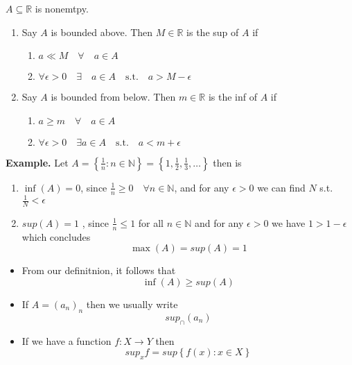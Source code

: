 \documentclass{article}
\theoremstyle{remark}
\begin{document}
\begin{lemma}
  $A \subseteq  \mathbb{R} $  is nonemtpy. 
  \begin{enumerate}
    \item Say $A$ is bounded above. Then $M \in  \mathbb{R} $ is the sup of $A$ if 
      \begin{enumerate}
        \item $a \ll  M \quad  \forall \quad  a \in  A  $ 
        \item $\forall \epsilon > 0 \quad  \exists \quad   a \in  A \quad  \text{s.t.} \quad a > M  - \epsilon    $
      \end{enumerate}
    \item Say $A$ is bounded from below.  Then $m \in  \mathbb{R} $ is the inf of $A$ if 
      \begin{enumerate}
        \item $a \ge m \quad  \forall \quad  a \in  A  $
        \item $ \forall \epsilon  > 0 \quad  \exists a \in  A \quad  \text{s.t.} \quad  a < m +\epsilon    $
      \end{enumerate}
  \end{enumerate}
\end{lemma}
   
\begin{tcolorbox}
  \textbf{Example.} Let $A = \left\{ \frac{1}{n} : n \in \mathbb{N}   \right\} = \left\{ 1, \frac{1}{2} , \frac{1}{3} , \ldots \right\}$ then is 
  \begin{enumerate}
    \item $\inf \left( A \right) = 0$, since $\frac{1}{n} \ge 0 \quad  \forall n \in  \mathbb{N}  $, and for any $\epsilon  > 0$ we can find $N$ s.t. $\frac{1}{N} < \epsilon $
    \item $sup\left( A \right) = 1$ , since $\frac{1}{n} \le 1$ for all $n \in  \mathbb{N} $ and for any $\epsilon  > 0$ we have $1 > 1- \epsilon $ which concludes \[
    \max \left( A \right) = sup \left( A \right) = 1
    \] 
  \end{enumerate}
\end{tcolorbox}

\begin{itemize}
  \item From our definitnion, it follows that \[
      \inf \left( A \right) \ge sup \left( A \right)
  \] 
\item If $A = \left( a_{n} \right)_{n}$  then we usually write \[
{sup}_{\cap } \left( a_{n} \right)
\] 
\item If we have a function $f: X \to  Y$ then \[
    {sup}_{x} f = sup \left\{ f\left( x \right) : x \in  X \right\}
\] 
\end{itemize}
\end{document}
